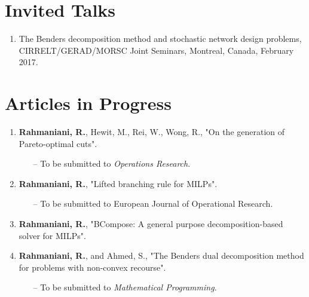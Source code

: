 \documentclass[10PT,letter]{article}
\newcounter{papercnt}
\newcommand{\numbox}[1]{} %
\begin{document}
\section*{\numbox{3}\bfseries\textcolor{titlecol}{\sffamily  Invited Talks }}                  
      \begin{enumerate}
      	\item The Benders decomposition method and stochastic network design problems, CIRRELT/GERAD/MORSC Joint Seminars, Montreal, Canada, February 2017.
      \end{enumerate}
  \section*{\numbox{6}\bfseries\textcolor{titlecol}{\sffamily Articles  in Progress}}
        \begin{enumerate}[itemsep=.5mm]
            \item 
            		\textbf{Rahmaniani, R.}, Hewit, M., Rei, W., Wong, R., "On the generation of  Pareto-optimal cuts".
            		\begin{itemize}
            			\item[--] To be submitted to \textit{Operations Research}.
	            	\end{itemize}
			\item 
					\textbf{Rahmaniani, R.}, "Lifted branching rule for MILPs".
					\begin{itemize}
						\item[--] To be submitted to European Journal of Operational Research.
					\end{itemize}
			\item 
					\textbf{Rahmaniani, R.}, "BCompose: A general purpose decomposition-based solver for MILPs".
		  \item 
					\textbf{Rahmaniani, R.}, and Ahmed, S., "The Benders dual decomposition method for problems with non-convex recourse".
					\begin{itemize}
						\item[--] To be submitted to \textit{Mathematical Programming}.
					\end{itemize}
        \end{enumerate}
        \setcounter{papercnt}{\value{enumi}}
\end{document}

